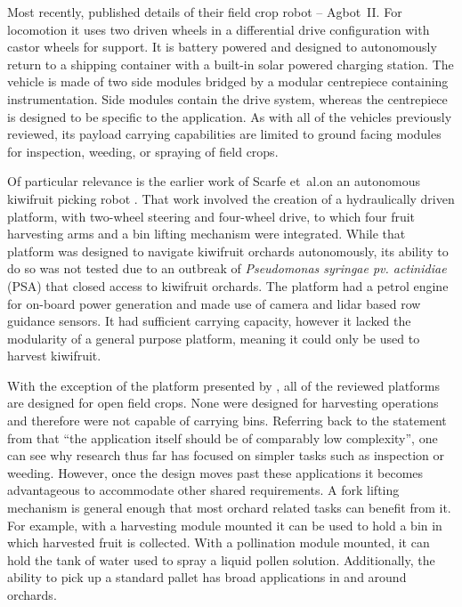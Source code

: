 \documentclass[preprint,authoryear,12pt]{elsarticle}
\begin{document}
        Most recently, \cite{Bawden2017} published details of their field crop robot -- Agbot~II.
        For locomotion it uses two driven wheels in a differential drive configuration with castor wheels for support.
        It is battery powered and designed to autonomously return to a shipping container with a built-in solar powered charging station.
        The vehicle is made of two side modules bridged by a modular centrepiece containing instrumentation.
        Side modules contain the drive system, whereas the centrepiece is designed to be specific to the application.
        As with all of the vehicles previously reviewed, its payload carrying capabilities are limited to ground facing modules for inspection, weeding, or spraying of field crops.


        Of particular relevance is the earlier work of Scarfe et~al.\@ on an autonomous kiwifruit picking robot \citep{scarfe2009, Scarfe2012}.
        That work involved the creation of a hydraulically driven platform, with two-wheel steering and four-wheel drive, to which four fruit harvesting arms and a bin lifting mechanism were integrated.
        While that platform was designed to navigate kiwifruit orchards autonomously, its ability to do so was not tested due to an outbreak of \textit{Pseudomonas syringae pv. actinidiae} (PSA) that closed access to kiwifruit orchards.
        The platform had a petrol engine for on-board power generation and made use of camera and lidar based row guidance sensors.
        It had sufficient carrying capacity, however it lacked the modularity of a general purpose platform, meaning it could only be used to harvest kiwifruit.

        With the exception of the platform presented by \cite{Scarfe2012}, all of the reviewed platforms are designed for open field crops.
        None were designed for harvesting operations and therefore were not capable of carrying bins.
        Referring back to the statement from \cite{Ruckelshausen2009} that ``the application itself should be of comparably low complexity'', one can see why research thus far has focused on simpler tasks such as inspection or weeding.
        However, once the design moves past these applications it becomes advantageous to accommodate other shared requirements.
        A fork lifting mechanism is general enough that most orchard related tasks can benefit from it.
        For example, with a harvesting module mounted it can be used to hold a bin in which harvested fruit is collected.
        With a pollination module mounted, it can hold the tank of water used to spray a liquid pollen solution.
        Additionally, the ability to pick up a standard pallet has broad applications in and around orchards.
\end{document}
